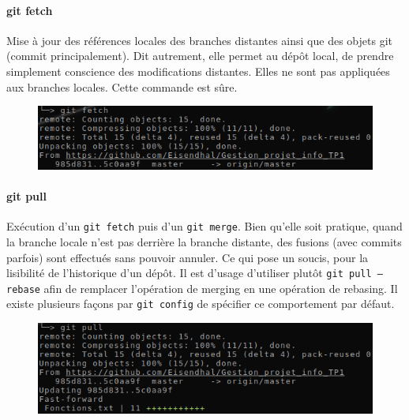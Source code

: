 \documentclass[11pt,canadien]{article}
\begin{document}
\paragraph{git fetch}Mise à jour des références locales des branches distantes ainsi que des objets git (commit principalement). Dit autrement, elle permet au dépôt local, de prendre simplement conscience des modifications distantes. Elles ne sont pas appliquées aux branches locales. Cette commande est sûre.
\begin{figure}[H]
	\centering
	\includegraphics{images/git_fetch.png}
\end{figure}

\paragraph{git pull}Exécution d'un \texttt{git fetch} puis d'un \texttt{git merge}. Bien qu'elle soit pratique, quand la branche locale n'est pas derrière la branche distante, des fusions (avec commits parfois) sont effectués sans pouvoir annuler. Ce qui pose un soucis, pour la lisibilité de l'historique d'un dépôt. Il est d'usage d'utiliser plutôt \texttt{git pull --rebase} afin de remplacer l'opération de merging en une opération de rebasing. Il existe plusieurs façons par \texttt{git config} de spécifier ce comportement par défaut.
\begin{figure}[H]
	\centering
	\includegraphics{images/git_pull.png}
\end{figure}
\end{document}
